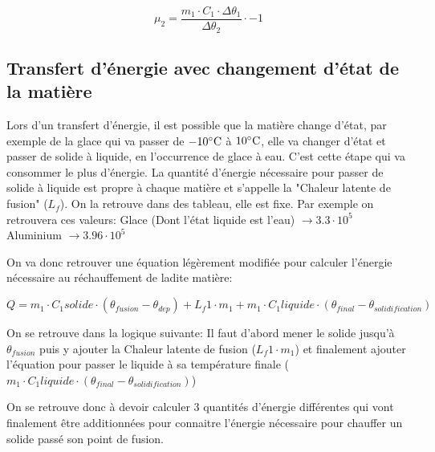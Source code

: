 \documentclass{article}
\begin{document}
\begin{equation}
	\mu_2 = \frac{m_1 \cdot C_1 \cdot \Delta\theta_1}{\Delta\theta_2} \cdot -1
\end{equation}

\subsection{Transfert d'énergie avec changement d'état de la matière}

Lors d'un transfert d'énergie, il est possible que la matière change d'état, 
par exemple de la glace qui va passer de $-10\celsius$ à $10\celsius$, 
elle va changer d'état et passer de solide à liquide, en l'occurrence de glace à eau.
\newline
C'est cette étape qui va consommer le plus d'énergie. La quantité d'énergie nécessaire pour
passer de solide à liquide est propre à chaque matière et s'appelle
la "Chaleur latente de fusion" ($L_f$). On la retrouve dans des tableau, elle est fixe.
\newline
\newline
Par exemple on retrouvera ces valeurs:
\newline
\newline
Glace (Dont l'état liquide est l'eau) $\rightarrow 3.3\cdot10^5$
\newline
Aluminium $\rightarrow 3.96 \cdot 10^5$
\newline
\newline

On va donc retrouver une équation légèrement modifiée pour calculer l'énergie
nécessaire au réchauffement de ladite matière:

\begin{equation}
	Q = m_1 \cdot C_1solide \cdot (\theta_{fusion} - \theta_{dep}) + L_f1 \cdot m_1 + m_1 \cdot C_1liquide \cdot (\theta_{final} - \theta_{solidification})
\end{equation}

On se retrouve dans la logique suivante:
\newline
\newline
Il faut d'abord mener le solide jusqu'à $\theta_{fusion}$ puis y ajouter la Chaleur
latente de fusion ($L_f1 \cdot m_1$) et finalement ajouter l'équation pour passer
le liquide à sa température finale ($m_1 \cdot C_1liquide \cdot (\theta_{final} - \theta_{solidification})$)
\newline
\newline

On se retrouve donc à devoir calculer 3 quantités d'énergie différentes qui vont finalement être additionnées pour connaitre l'énergie nécessaire pour chauffer un solide passé son point de fusion.
\end{document}
